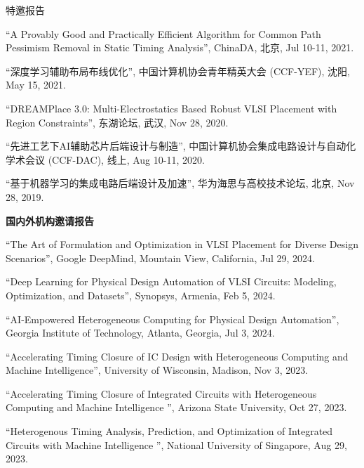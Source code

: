 \begin{rSection}{特邀报告}
\begin{description}[font=\normalfont]
\item[{[T5]}]{
``A Provably Good and Practically Efficient Algorithm for Common Path Pessimism Removal in Static Timing Analysis'', ChinaDA, 北京, Jul 10-11, 2021. 
}

\item[{[T4]}]{
``深度学习辅助布局布线优化'', 中国计算机协会青年精英大会 (CCF-YEF), 沈阳, May 15, 2021. 
}

\item[{[T3]}]{
``DREAMPlace 3.0: Multi-Electrostatics Based Robust VLSI Placement with Region Constraints'', 东湖论坛, 武汉, Nov 28, 2020.
}

\item[{[T2]}]{
``先进工艺下AI辅助芯片后端设计与制造'', 中国计算机协会集成电路设计与自动化学术会议 (CCF-DAC), 线上, Aug 10-11, 2020. 
}

\item[{[T1]}]{
``基于机器学习的集成电路后端设计及加速'', 华为海思与高校技术论坛, 北京, Nov 28, 2019. 
}

\end{description}

\textbf{国内外机构邀请报告}
        
\begin{description}[font=\normalfont]

\item[{[T11]}]{
``The Art of Formulation and Optimization in VLSI Placement for Diverse Design Scenarios'', Google DeepMind, Mountain View, California, Jul 29, 2024. 
}

\item[{[T10]}]{
``Deep Learning for Physical Design Automation of VLSI Circuits: Modeling, Optimization, and Datasets'', Synopsys, Armenia, Feb 5, 2024. 
}

\item[{[T9]}]{
``AI-Empowered Heterogeneous Computing for Physical Design Automation'', Georgia Institute of Technology, Atlanta, Georgia, Jul 3, 2024. 
}

\item[{[T8]}]{
``Accelerating Timing Closure of IC Design with Heterogeneous Computing and Machine Intelligence'', University of Wisconsin, Madison, Nov 3, 2023. 
}

\item[{[T7]}]{
``Accelerating Timing Closure of Integrated Circuits with Heterogeneous Computing and Machine Intelligence '', Arizona State University, Oct 27, 2023. 
}

\item[{[T6]}]{
``Heterogenous Timing Analysis, Prediction, and Optimization of Integrated Circuits with Machine Intelligence '', National University of Singapore, Aug 29, 2023. 
}


\end{description}
\end{rSection}
